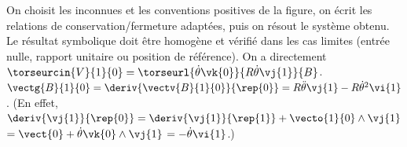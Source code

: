 \begin{corrigebox}
On choisit les inconnues et les conventions positives de la figure,
        on écrit les relations de conservation/fermeture adaptées, puis on résout le
        système obtenu. Le résultat symbolique doit être homogène et vérifié dans les cas
        limites (entrée nulle, rapport unitaire ou position de référence).
On a directement $\torseurcin{V}{1}{0} = \torseurl{\dot{\theta}\vk{0}}{R\dot{\theta}\vj{1}}{B}$.
$\vectg{B}{1}{0} = \deriv{\vectv{B}{1}{0}}{\rep{0}}=R\ddot{\theta}\vj{1}-R\dot{\theta}^2\vi{1}$.
(En effet,  $\deriv{\vj{1}}{\rep{0}} = \deriv{\vj{1}}{\rep{1}} + \vecto{1}{0}\wedge \vj{1} $ $=\vect{0}+\dot{\theta}\vk{0}\wedge \vj{1}$ $=-\dot{\theta}\vi{1}$.)
\end{corrigebox}
